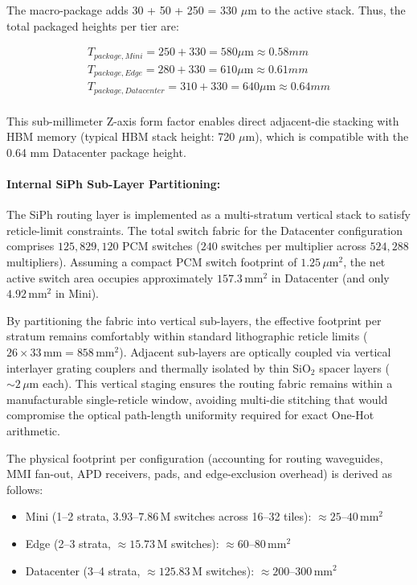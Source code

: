 \documentclass[journal]{IEEEtran}
\begin{document}
The macro-package adds 30 + 50 + 250 = 330 $\mu$m to the active stack. 
Thus, the total packaged heights per tier are:

\begin{equation}
\begin{aligned}
T_{package,Mini} = 250 + 330 = 580 \mu\text{m} \approx 0.58 mm \\
T_{package,Edge} = 280 + 330 = 610 \mu\text{m} \approx 0.61 mm \\
T_{package,Datacenter} = 310 + 330 = 640 \mu\text{m} \approx 0.64 mm \\
\end{aligned}
\end{equation}

This sub-millimeter Z-axis form factor enables direct adjacent-die stacking with HBM memory (typical HBM stack height: 720 $\mu$m), which is compatible with the 0.64 mm Datacenter package height.

\paragraph{\textbf{Internal SiPh Sub-Layer Partitioning:}}

The SiPh routing layer is implemented as a multi-stratum vertical stack to satisfy reticle-limit constraints. The total switch fabric for the Datacenter configuration comprises $125,829,120$ PCM switches ($240$ switches per multiplier across $524,288$ multipliers). Assuming a compact PCM switch footprint of $1.25\,\mu\text{m}^{2}$, the net active switch area occupies approximately $157.3\,\text{mm}^2$ in Datacenter (and only $4.92\,\text{mm}^2$ in Mini).

By partitioning the fabric into vertical sub-layers, the effective footprint per stratum remains comfortably within standard lithographic reticle limits ($26 \times 33\,\text{mm} = 858\,\text{mm}^2$). Adjacent sub-layers are optically coupled via vertical interlayer grating couplers and thermally isolated by thin SiO$_2$ spacer layers ($\sim 2\,\mu\text{m}$ each). This vertical staging ensures the routing fabric remains within a manufacturable single-reticle window, avoiding multi-die stitching that would compromise the optical path-length uniformity required for exact One-Hot arithmetic.

The physical footprint per configuration (accounting for routing waveguides, MMI fan-out, APD receivers, pads, and edge-exclusion overhead) is derived as follows:

\begin{itemize}
\item Mini (1--2 strata, $3.93\text{--}7.86\,\text{M}$ switches across 16--32 tiles): $\approx 25\text{--}40\,\text{mm}^{2}$
\item Edge (2--3 strata, $\approx 15.73\,\text{M}$ switches): $\approx 60\text{--}80\,\text{mm}^{2}$
\item Datacenter (3--4 strata, $\approx 125.83\,\text{M}$ switches): $\approx 200\text{--}300\,\text{mm}^{2}$
\end{itemize}
\end{document}
